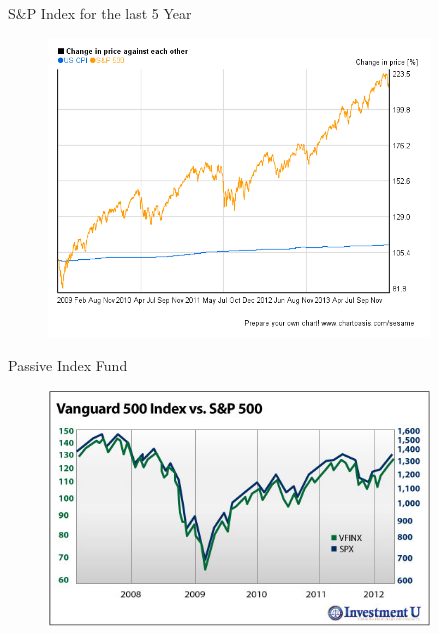 \documentclass[handout]{beamer}
\begin{document}
\begin{frame}{S\&P Index for the last 5 Year}

  \begin{figure}
    \centering
    \includegraphics[width = 0.9\textwidth]{figure/snp500.png}
  \end{figure}

\end{frame}

\begin{frame}{Passive Index Fund}
   \begin{figure}
    \centering
    \includegraphics[width = 0.9\textwidth]{figure/vanguard.jpg}
  \end{figure}
\end{frame}
\end{document}
